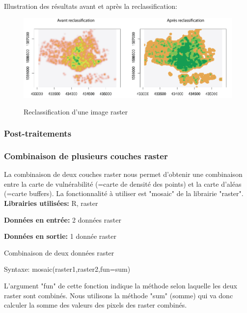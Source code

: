 Illustration des résultats avant et après la reclassification:

\begin{center}
\begin{figure}[h] \centering
\includegraphics[width=14cm]{reclassification}\\
\caption{\label{reclassifications} Reclassification d'une image raster}
\end{figure}
\end{center}


\subsubsection{Post-traitements}

\subsubsection{Combinaison de plusieurs couches raster}

La combinaison de deux couches raster nous permet d'obtenir une combinaison entre la carte de vulnérabilité (=carte de densité des points) et la carte d'aléas (=carte buffers). La fonctionnalité à utiliser est "mosaic" de la librairie "raster".\\

\textbf{Librairies utilisées:} R, raster

\textbf{Données en entrée:}  2 données raster

\textbf{Données en sortie:} 1 donnée raster\\

\begin{algorithm}[H]
\caption{\label{mosaic} Combinaison de deux données raster}
Syntaxe:
mosaic(raster1,raster2,fun=sum)
\end{algorithm}

L'argument "fun" de cette fonction indique la méthode selon laquelle les deux raster sont combinés. Nous utilisons la méthode "sum" (somme) qui va donc calculer la somme des valeurs des pixels des raster combinés.


